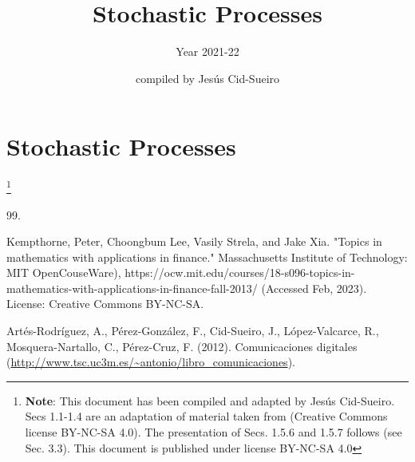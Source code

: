 \documentclass[graybox,sectrefs]{svmono_mod}
\begin{document}
\author{compiled by Jes\'us Cid-Sueiro}
\title{Stochastic Processes}
\subtitle{Year 2021-22}

\chapter{Stochastic Processes}
\footnote{\textbf{Note}: This document has been compiled and adapted by Jesús Cid-Sueiro. Secs 1.1-1.4 are an adaptation of material taken from \cite{MITcourse} (Creative Commons license BY-NC-SA 4.0). The presentation of Secs. 1.5.6 and 1.5.7 follows \cite{ComDig2007} (see Sec. 3.3). This document is published under license BY-NC-SA 4.0}
\vspace{11cm}

\mainmatter 
\tableofcontents



\begin{thebibliography}{99.}

Kempthorne, Peter, Choongbum Lee, Vasily Strela, and Jake Xia. "Topics in mathematics with applications in finance." Massachusetts Institute of Technology: MIT OpenCouseWare), https://ocw.mit.edu/courses/18-s096-topics-in-mathematics-with-applications-in-finance-fall-2013/ (Accessed Feb, 2023). License: Creative Commons BY-NC-SA.

Artés-Rodríguez, A., Pérez-González, F., Cid-Sueiro, J., López-Valcarce, R., Mosquera-Nartallo, C., Pérez-Cruz, F. (2012). Comunicaciones digitales (\url{http://www.tsc.uc3m.es/~antonio/libro_comunicaciones}).

\end{thebibliography}
\end{document}
